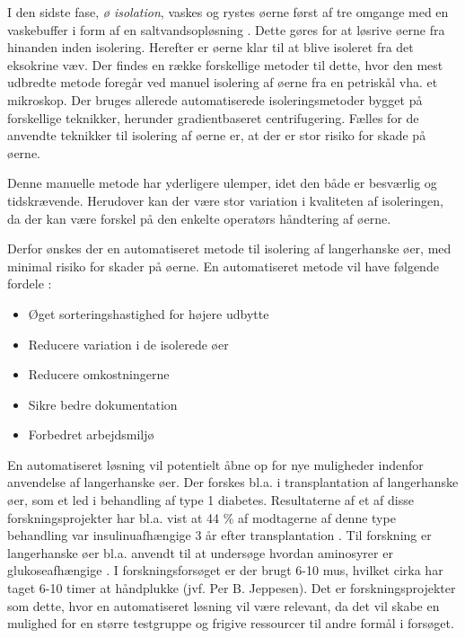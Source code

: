 I den sidste fase, \textit{ø isolation}, vaskes og rystes øerne først af tre omgange med en vaskebuffer i form af en saltvandsopløsning \citep{hbbs}. Dette gøres for at løsrive øerne fra hinanden inden isolering. Herefter er øerne klar til at blive isoleret fra det eksokrine væv. Der findes en række forskellige metoder til dette, hvor den mest udbredte metode foregår ved manuel isolering af øerne fra en petriskål vha. et mikroskop. Der bruges allerede automatiserede isoleringsmetoder bygget på forskellige teknikker, herunder gradientbaseret centrifugering. Fælles for de anvendte teknikker til isolering af øerne er, at der er stor risiko for skade på øerne. 

Denne manuelle metode har yderligere ulemper, idet den både er besværlig og tidskrævende. Herudover kan der være stor variation i kvaliteten af isoleringen, da der kan være forskel på den enkelte operatørs håndtering af øerne. 

Derfor ønskes der en automatiseret metode til isolering af langerhanske øer, med minimal risiko for skader på øerne. En automatiseret metode vil have følgende fordele \cite{pptintro}: 

\begin{itemize}
\item Øget sorteringshastighed for højere udbytte
\item Reducere variation i de isolerede øer
\item Reducere omkostningerne
\item Sikre bedre dokumentation
\item Forbedret arbejdsmiljø
\end{itemize} 

En automatiseret løsning vil potentielt åbne op for nye muligheder indenfor anvendelse af langerhanske øer. Der forskes bl.a. i transplantation af langerhanske øer, som et led i behandling af type 1 diabetes. Resultaterne af et af disse forskningsprojekter har bl.a. vist at 44 \% af modtagerne af denne type behandling var insulinuafhængige 3 år efter transplantation \citep{islettransplantation}. Til forskning er langerhanske øer bl.a. anvendt til at undersøge hvordan aminosyrer er glukoseafhængige \citep{aminosyre}. I forskningsforsøget er der brugt 6-10 mus, hvilket cirka har taget 6-10 timer at håndplukke (jvf. Per B. Jeppesen). Det er forskningsprojekter som dette, hvor en automatiseret løsning vil være relevant, da det vil skabe en mulighed for en større testgruppe og frigive ressourcer til andre formål i forsøget.

